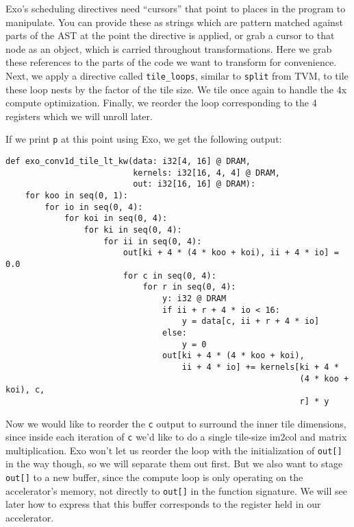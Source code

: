 \documentclass[acmsmall, nonacm=true]{acmart}
\begin{document}
Exo's scheduling directives need ``cursors'' that point to places in the program to manipulate. You can provide these as strings which are pattern matched against parts of the AST at the point the directive is applied, or grab a cursor to that node as an object, which is carried throughout transformations. Here we grab these references to the parts of the code we want to transform for convenience. Next, we apply a directive called \verb|tile_loops|, similar to \verb|split| from TVM, to tile these loop nests by the factor of the tile size. We tile once again to handle the 4x compute optimization. Finally, we reorder the loop corresponding to the 4 registers which we will unroll later.

If we print \verb|p| at this point using Exo, we get the following output:
\begin{verbatim}
def exo_conv1d_tile_lt_kw(data: i32[4, 16] @ DRAM,
                          kernels: i32[16, 4, 4] @ DRAM,
                          out: i32[16, 16] @ DRAM):
    for koo in seq(0, 1):
        for io in seq(0, 4):
            for koi in seq(0, 4):
                for ki in seq(0, 4):
                    for ii in seq(0, 4):
                        out[ki + 4 * (4 * koo + koi), ii + 4 * io] = 0.0
                        for c in seq(0, 4):
                            for r in seq(0, 4):
                                y: i32 @ DRAM
                                if ii + r + 4 * io < 16:
                                    y = data[c, ii + r + 4 * io]
                                else:
                                    y = 0
                                out[ki + 4 * (4 * koo + koi),
                                    ii + 4 * io] += kernels[ki + 4 *
                                                            (4 * koo + koi), c,
                                                            r] * y
\end{verbatim}
Now we would like to reorder the \verb|c| output to surround the inner tile dimensions, since inside each iteration of \verb|c| we'd like to do a single tile-size im2col and matrix multiplication. Exo won't let us reorder the loop with the initialization of \verb|out[]| in the way though,
 so we will separate them out first. But we also want to stage \verb|out[]| to a new buffer, since the compute loop is only operating on the accelerator's memory, not directly to \verb|out[]| in the function signature. We will see later how to express that this buffer corresponds to the register held in our accelerator. 
\end{document}

